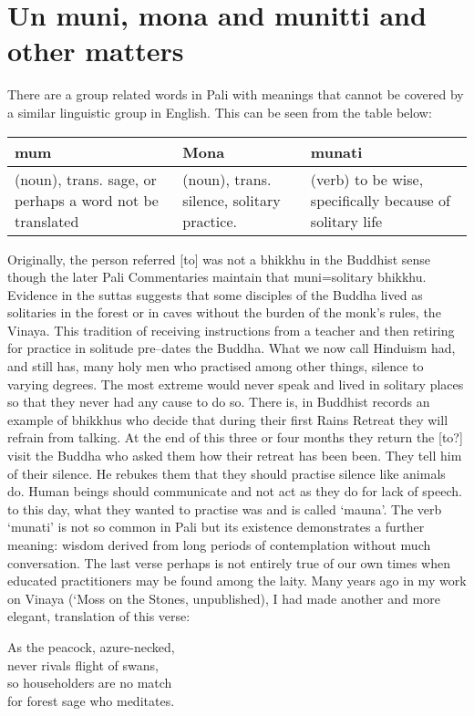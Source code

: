 \section{Un muni, mona and munitti and other matters}
There are a group related words in Pali with meanings that cannot be covered by a similar linguistic group in English. This can be seen from the table below:
\newline
\newline
\begin{tabular}{|p{4cm}|p{4cm}|p{4cm}|}
\hline
\textbf{mum}&\textbf{Mona}&\textbf{munati}\\ \hline
(noun), trans. sage, or perhaps a word not be translated& (noun), trans. silence, solitary practice.& (verb) to be wise, specifically because of solitary life \\ \hline
\end{tabular}
\newline
\newline
Originally, the person referred [to] was not a bhikkhu in the Buddhist sense though the later Pali Commentaries maintain that muni=solitary bhikkhu. Evidence in the suttas suggests that some disciples of the Buddha lived as solitaries in the forest or in caves without the burden of the monk's rules, the Vinaya. This tradition of receiving instructions from a teacher and then retiring for practice in solitude pre--dates the Buddha. What we now call Hinduism had, and still has, many holy men who practised among other things, silence to varying degrees. The most extreme would never speak and lived in solitary places so that they never had any cause to do so. There is, in Buddhist records an example of bhikkhus who decide that during their ﬁrst Rains Retreat they will refrain from talking. At the end of this three or four months they return the [to?] visit the Buddha who asked them how their retreat has been been. They tell him of their silence. He rebukes them that they should practise silence like animals do. Human beings should communicate and not act as they do for lack of speech. to   this day, what they wanted to practise was and is called `mauna'. The verb `munati' is not so common in Pali but its existence demonstrates a further meaning: wisdom derived from long periods of contemplation without much conversation. 
The last verse perhaps is not entirely true of our own times when educated practitioners may be found among the laity. Many years ago in my work on Vinaya (`Moss on the Stones, unpublished), I had made another and more elegant, translation of this verse:
\begin{MyDescription}{}
As the peacock, azure-necked,\\
never rivals ﬂight of swans,\\
so householders are no match\\
for forest sage who meditates.
\end{MyDescription}

